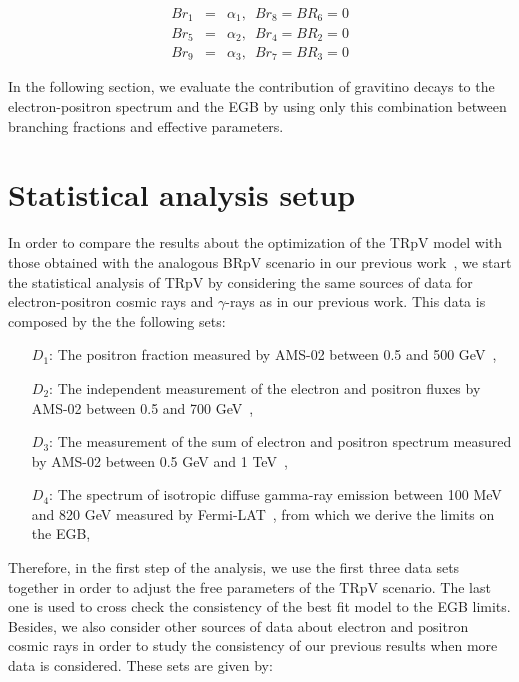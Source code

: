\documentclass[a4paper,11pt]{article}
\begin{document}
\begin{eqnarray}
Br_{1} & = & \alpha_{1},\,\,\,Br_{8}=BR_{6}=0 \\
Br_{5} & = & \alpha_{2},\,\,\,Br_{4}=BR_{2}=0 \nonumber\\
Br_{9} & = & \alpha_{3},\,\,\,Br_{7}=BR_{3}=0 \nonumber
\end{eqnarray}

In the following section, we evaluate the contribution of gravitino decays to the electron-positron spectrum and the EGB by using only this combination between branching fractions and effective parameters.

\section{Statistical analysis setup}
\label{sec:stats}

In order to compare the results about the optimization of the TRpV model with those obtained with the analogous BRpV scenario in our previous work~\cite{Carquin:2015uma}, we start the statistical analysis of TRpV by considering the same sources of data for electron-positron cosmic rays and $\gamma$-rays as in our previous work. This data is composed by the the following sets:

\begin{itemize}
\item[$D_1$:] The positron fraction measured by AMS-02 between 0.5 and 500 GeV~\cite{Accardo:2014lma},
\item[$D_2$:] The independent measurement of the electron and positron fluxes by AMS-02 between 0.5 and 700 GeV~\cite{Aguilar:2014mma},
\item[$D_3$:] The measurement of the sum of electron and positron spectrum measured by AMS-02 between 0.5 GeV and 1 TeV~\cite{Aguilar:2014fea},
\item[$D_4$:] The spectrum of isotropic diffuse gamma-ray emission between 100 MeV and 820 GeV measured by Fermi-LAT~\cite{Ackermann:2014usa}, from which we derive the limits on the EGB,
\end{itemize}

Therefore, in the first step of the analysis, we use the first three data sets together in order to adjust the free parameters of the TRpV scenario. The last one is used to cross check the consistency of the best fit model to the EGB limits. Besides, we also consider other sources of data about electron and positron cosmic rays in order to study the consistency of our previous results when more data is considered. These sets are given by:
\end{document}
